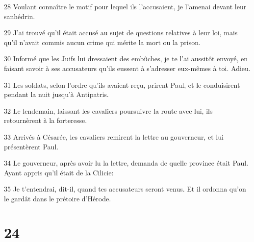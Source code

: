 \par 28 Voulant connaître le motif pour lequel ils l'accusaient, je l'amenai devant leur sanhédrin.
\par 29 J'ai trouvé qu'il était accusé au sujet de questions relatives à leur loi, mais qu'il n'avait commis aucun crime qui mérite la mort ou la prison.
\par 30 Informé que les Juifs lui dressaient des embûches, je te l'ai aussitôt envoyé, en faisant savoir à ses accusateurs qu'ils eussent à s'adresser eux-mêmes à toi. Adieu.
\par 31 Les soldats, selon l'ordre qu'ils avaient reçu, prirent Paul, et le conduisirent pendant la nuit jusqu'à Antipatris.
\par 32 Le lendemain, laissant les cavaliers poursuivre la route avec lui, ils retournèrent à la forteresse.
\par 33 Arrivés à Césarée, les cavaliers remirent la lettre au gouverneur, et lui présentèrent Paul.
\par 34 Le gouverneur, après avoir lu la lettre, demanda de quelle province était Paul. Ayant appris qu'il était de la Cilicie:
\par 35 Je t'entendrai, dit-il, quand tes accusateurs seront venus. Et il ordonna qu'on le gardât dans le prétoire d'Hérode.

\chapter{24}

